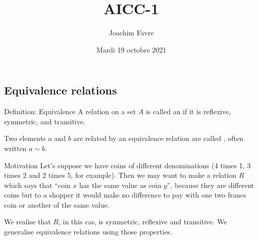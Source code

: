 \documentclass[a4paper]{article}
\title{AICC-1}
\author{Joachim Favre}
\date{Mardi 19 octobre 2021}
\begin{document}
\maketitle


\subsection{Equivalence relations}

\begin{parag}{Definition: Equivalence}
    A relation on a set $A$ is called an  if it is reflexive, symmetric, and transitive.

    Two elements $a$ and $b$ are related by an equivalence relation are called , often written $a \sim b$.

    \begin{subparag}{Motivation}
        Let's suppose we have coins of different denominations (4 times 1, 3 times 2 and 2 times 5, for example). Then we may want to make a relation $R$ which says that ``coin $x$ has the same value as coin $y$'', because they are different coins but to a shopper it would make no difference to pay with one two francs coin or another of the same value.

    We realise that $R$, in this cas, is symmetric, reflexive and transitive. We generalise equivalence relations using those properties.

    \end{subparag}
\end{parag}
\end{document}
